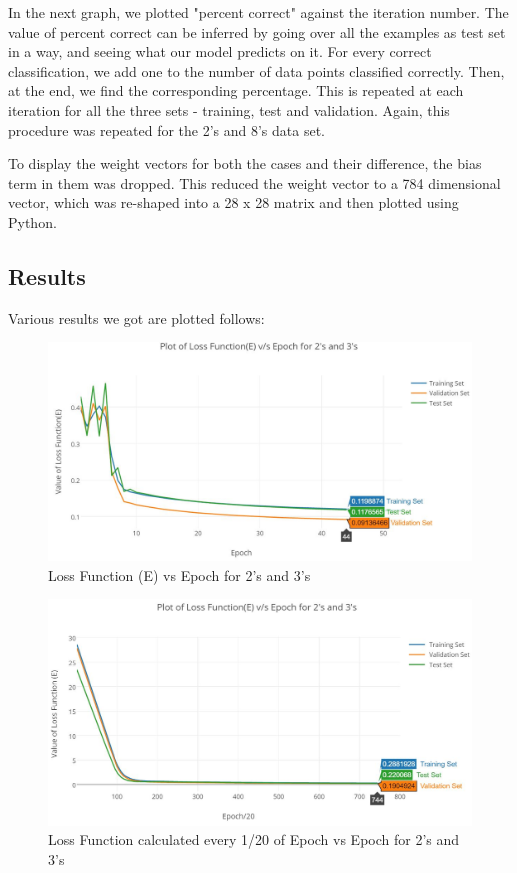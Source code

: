\documentclass{article}
\begin{document}
In the next graph, we plotted "percent correct" against the iteration number. The value of percent correct can be inferred by going over all the examples as test set in a way, and seeing what our model predicts on it. For every correct classification, we add one to the number of data points classified correctly. Then, at the end, we find the corresponding percentage. This is repeated at each iteration for all the three sets - training, test and validation. Again, this procedure was repeated for the 2's and 8's data set.

To display the weight vectors for both the cases and their difference, the bias term in them was dropped. This reduced the weight vector to a 784 dimensional vector, which was re-shaped into a 28 x 28 matrix and then plotted using Python.

\subsection{Results}

Various results we got are plotted follows:

\begin{figure}[h!]
  \centering
  \includegraphics[width=\linewidth]{graphs/4a_23.JPG}
  \caption{Loss Function (E) vs Epoch for 2's and 3's}
  \label{fig:graph 4(a)_23}
\end{figure}

\begin{figure}[h!]
  \centering
  \includegraphics[width=\linewidth]{graphs/4a.JPG}
  \caption{Loss Function calculated every 1/20 of Epoch vs Epoch for 2's and 3's}
    \label{fig:graph 4(a)_batch_23}
\end{figure}
\end{document}
